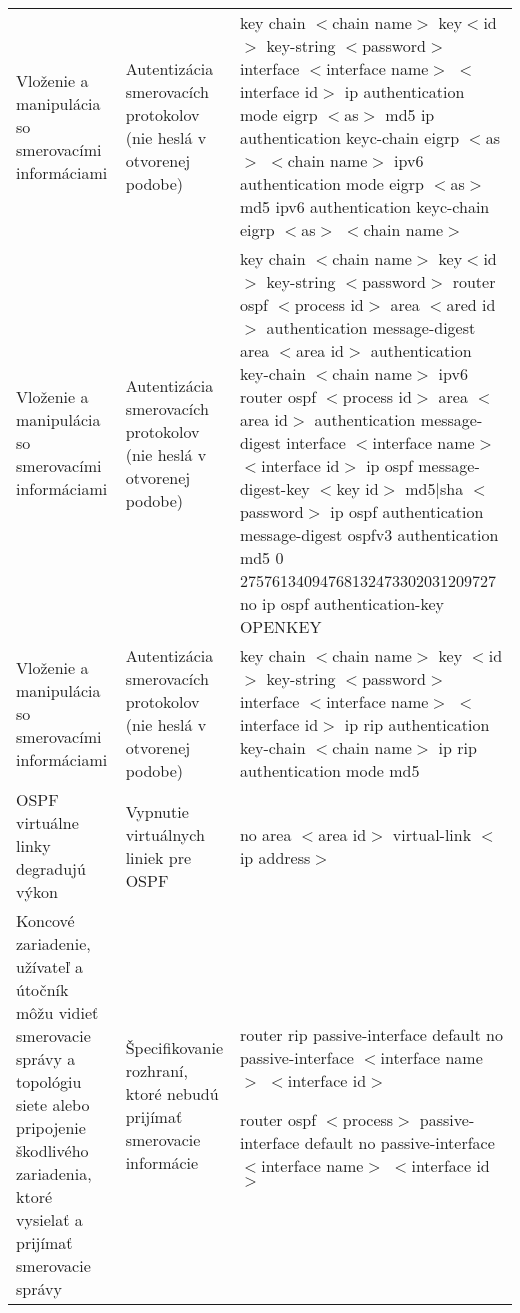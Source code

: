\begin{longtable}[!htbp]{|L{10em}L{10em}L{34em}|}
	Vloženie a manipulácia so smerovacími informáciami	&Autentizácia smerovacích protokolov (nie heslá v otvorenej podobe)	&key chain $<$chain name$>$
	key$<$id$>$
	key-string $<$password$>$
	interface $<$interface name$>$ $<$interface id$>$
	ip authentication mode eigrp $<$as$>$ md5
	ip authentication keyc-chain eigrp $<$as$>$ $<$chain name$>$
	ipv6 authentication mode eigrp $<$as$>$ md5
	ipv6 authentication keyc-chain eigrp $<$as$>$ $<$chain name$>$
	\\
	Vloženie a manipulácia so smerovacími informáciami	&Autentizácia smerovacích protokolov (nie heslá v otvorenej podobe)	&key chain $<$chain name$>$
	key$<$id$>$
	key-string $<$password$>$
	router ospf $<$process id$>$
	area $<$ared id$>$ authentication message-digest
	area $<$area id$>$ authentication key-chain $<$chain name$>$
	ipv6 router ospf $<$process id$>$
	area $<$area id$>$ authentication message-digest
	interface $<$interface name$>$ $<$interface id$>$
	ip ospf message-digest-key $<$key id$>$ md5|sha $<$password$>$
	ip ospf authentication message-digest
	ospfv3 authentication md5 0 27576134094768132473302031209727
	no ip ospf authentication-key OPENKEY
	\\
	Vloženie a manipulácia so smerovacími informáciami	&Autentizácia smerovacích protokolov (nie heslá v otvorenej podobe)	&key chain $<$chain name$>$
	key $<$id$>$
	key-string $<$password$>$
	interface $<$interface name$>$ $<$interface id$>$
	ip rip authentication key-chain $<$chain name$>$
	ip rip authentication mode md5\\
	OSPF virtuálne linky degradujú výkon	&Vypnutie virtuálnych liniek pre OSPF	&no area $<$area id$>$ virtual-link $<$ip address$>$\\
	Koncové zariadenie, užívateľ a útočník môžu vidieť smerovacie správy a topológiu siete alebo pripojenie škodlivého zariadenia, ktoré vysielať a prijímať smerovacie správy	&Špecifikovanie rozhraní, ktoré nebudú prijímať smerovacie informácie	&router rip
	passive-interface default
	no passive-interface $<$interface name$>$ $<$interface id$>$
	
	router ospf $<$process$>$
	passive-interface default
	no passive-interface $<$interface name$>$ $<$interface id$>$
	

\end{longtable}
